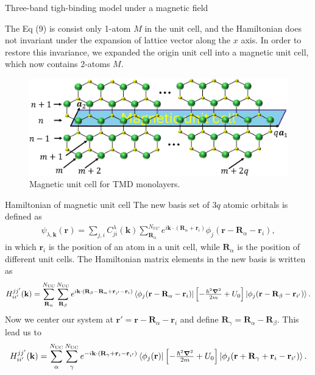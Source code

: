 \documentclass[aspectratio=169,compress,x11names]{beamer}
\begin{document}
	\begin{frame}{Three-band tigh-binding model under a magnetic field}
		\begin{multicols}{2}
			The Eq (9) is consist only 1-atom $M$ in the unit cell, and the Hamiltonian does not invariant under the expansion of lattice vector along the $x$ axis. In order to restore this invariance, we expanded the origin unit cell into a magnetic unit cell, which now contains $2$-atoms $M$.
			\columnbreak
			\begin{figure}
				\centering
				\includegraphics[width=\linewidth]{../pic/magneticUC_cut.pdf}
				\caption{\label{fig:Mag UC} Magnetic unit cell for TMD monolayers.}
			\end{figure}
		\end{multicols}
	\end{frame}
	\begin{frame}{Hamiltonian of magnetic unit cell}
		The new basis set of $3q$ atomic orbitals is defined as
		\begin{gather}
			\psi_{\lambda,\mathbf{k}}(\mathbf{r}) = \sum_{j,i} C_{ji}^{\lambda}(\mathbf{k}) \sum_{\mathbf{R}_{\alpha}}^{N_{UC}} e^{i\mathbf{k}\cdot(\mathbf{R}_{\alpha} + \mathbf{r}_{i})} \phi_{j}(\mathbf{r} - \mathbf{R}_{\alpha} - \mathbf{r}_{i}),
		\end{gather}
		in which $\mathbf{r}_{i}$ is the position of an atom in a unit cell, while $\mathbf{R}_{\alpha}$ is the position of different unit cells.
		The Hamiltonian matrix elements in the new basis is written as
		\begin{gather}
			H_{ii'}^{jj'}(\mathbf{k})
			= \sum_{\mathbf{R}_{\alpha}}^{N_\text{UC}}\sum_{\mathbf{R}_{\beta}}^{N_\text{UC}} e^{i \mathbf{k} \cdot (\mathbf{R}_{\beta} - \mathbf{R}_{\alpha} + \mathbf{r}_{i'} - \mathbf{r}_{i})}  \bra{\phi_{j}(\mathbf{r} - \mathbf{R}_{\alpha} - \mathbf{r}_{i})} \left[-\tfrac{\hbar^{2} \boldsymbol{\nabla}^{2}}{2m} + U_{0}\right] \ket{\phi_{j}(\mathbf{r} - \mathbf{R}_{\beta} - \mathbf{r}_{i'})}.
		\end{gather}
		Now we center our system at $\mathbf{r}'=\mathbf{r} - \mathbf{R}_{\alpha} - \mathbf{r}_{i}$ and define $\mathbf{R}_{\gamma} = \mathbf{R}_{\alpha} - \mathbf{R}_{\beta}$. This lead us to
		\begin{gather}
			H_{ii'}^{jj'}(\mathbf{k})
			= \sum_{{\alpha}}^{N_\text{UC}}\sum_{{\gamma}}^{N_\text{UC}} e^{-i \mathbf{k} \cdot (\mathbf{R}_{\gamma} + \mathbf{r}_{i} - \mathbf{r}_{i'})}  \bra{\phi_{j}(\mathbf{r})} \left[-\tfrac{\hbar^{2} \boldsymbol{\nabla}^{2}}{2m} + U_{0}\right] \ket{\phi_{j}(\mathbf{r} + \mathbf{R}_{\gamma} + \mathbf{r}_{i} - \mathbf{r}_{i'})}.
		\end{gather}
	\end{frame}
\end{document}
